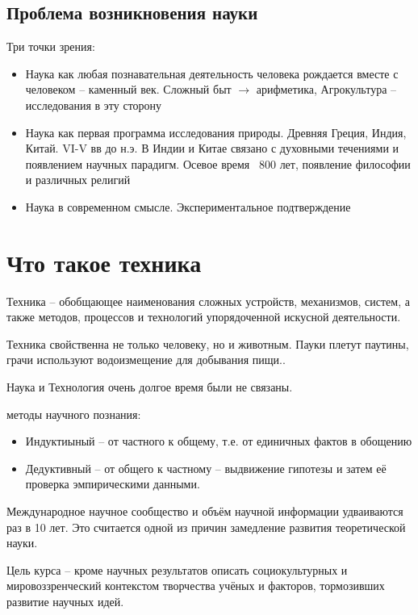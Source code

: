 \documentclass{book}
\theoremstyle{definition}
\begin{document}
    \subsection{Проблема возникновения науки}
    Три точки зрения:
    \begin{itemize}
        \item Наука как любая познавательная деятельность человека рождается вместе с человеком -- каменный век. Сложный быт $\to $ арифметика, Агрокультура -- исследования в эту сторону
        \item Наука как первая программа исследования природы. Древняя Греция, Индия, Китай. VI-V вв до н.э. В Индии и Китае связано с духовными течениями и появлением научных парадигм. Осевое время ~800 лет, появление философии и различных религий
        \item Наука в современном смысле. Экспериментальное подтверждение
    \end{itemize}

    \section{Что такое техника}

    \begin{definition}
        Техника -- обобщающее наименования сложных устройств, механизмов, систем, а также методов, процессов и технологий упорядоченной искусной деятельности.
    \end{definition}

    Техника свойственна не только человеку, но и животным. Пауки плетут паутины, грачи используют водоизмещение для добывания пищи..

    Наука и Технология очень долгое время были не связаны.

    методы научного познания:
    \begin{itemize}
        \item Индуктиыный -- от частного к общему, т.е. от единичных фактов в обощению
        \item Дедуктивный -- от общего к частному -- выдвижение гипотезы и затем её проверка эмпирическими данными.
    \end{itemize}

    Международное научное сообщество и объём научной информации удваиваются раз в 10 лет. Это считается одной из причин замедление развития теоретической науки.

    Цель курса -- кроме научных результатов описать социокультурных и мировоззренческий контекстом творчества учёных и факторов, тормозивших развитие научных идей.
\end{document}
